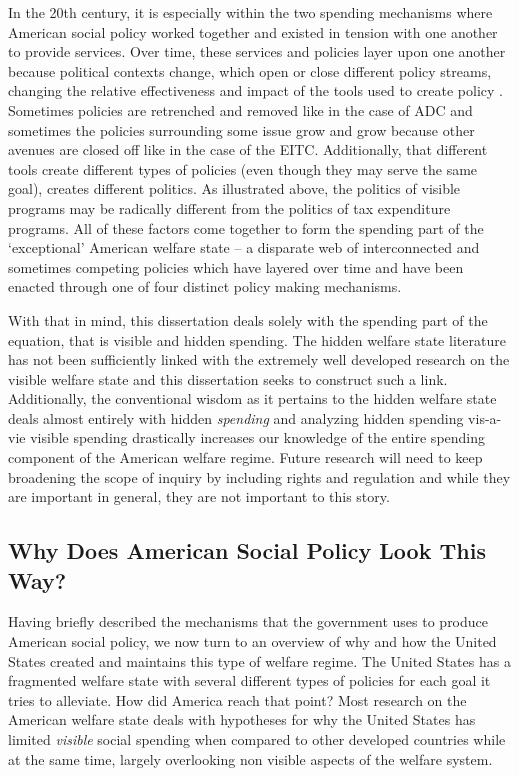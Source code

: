 \documentclass[12pt]{article}
\begin{document}
In the 20th century, it is especially within the two spending mechanisms where American social policy worked together and existed in tension with one another to provide services. Over time, these services and policies layer upon one another because political contexts change, which open or close different policy streams, changing the relative effectiveness and impact of the tools used to create policy \citep{kingdon2011}. Sometimes policies are retrenched and removed like in the case of ADC and sometimes the policies surrounding some issue grow and grow because other avenues are closed off like in the case of the EITC. Additionally, that different tools create different types of policies (even though they may serve the same goal), creates different politics. As illustrated above, the politics of visible programs may be radically different from the politics of tax expenditure programs. All of these factors come together to form the spending part of the `exceptional' American welfare state -- a disparate web of interconnected and sometimes competing policies which have layered over time and have been enacted through one of four distinct policy making mechanisms.

With that in mind, this dissertation deals solely with the spending part of the equation, that is visible and hidden spending. The hidden welfare state literature has not been sufficiently linked with the extremely well developed research on the visible welfare state and this dissertation seeks to construct such a link. Additionally, the conventional wisdom as it pertains to the hidden welfare state deals almost entirely with hidden \emph{spending} and analyzing hidden spending vis-a-vie visible spending drastically increases our knowledge of the entire spending component of the American welfare regime. Future research will need to keep broadening the scope of inquiry by including rights and regulation and while they are important in general, they are not important to this story.

\subsection{Why Does American Social Policy Look This Way?}
Having briefly described the mechanisms that the government uses to produce American social policy, we now turn to an overview of why and how the United States created and maintains this type of welfare regime. The United States has a fragmented welfare state with several different types of policies for each goal it tries to alleviate. How did America reach that point? Most research on the American welfare state deals with hypotheses for why the United States has limited \emph{visible} social spending when compared to other developed countries while at the same time, largely overlooking non visible aspects of the welfare system. 
\end{document}
